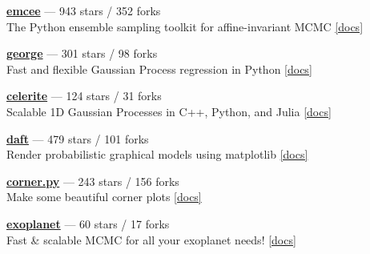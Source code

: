 \item \href{https://github.com/dfm/emcee}{{\bf emcee}} --- 943 stars / 352 forks \\
The Python ensemble sampling toolkit for affine-invariant MCMC \href{http://emcee.readthedocs.io}{[docs]}

\item \href{https://github.com/dfm/george}{{\bf george}} --- 301 stars / 98 forks \\
Fast and flexible Gaussian Process regression in Python \href{http://george.readthedocs.io}{[docs]}

\item \href{https://github.com/dfm/celerite}{{\bf celerite}} --- 124 stars / 31 forks \\
Scalable 1D Gaussian Processes in C++, Python, and Julia \href{http://celerite.rtfd.io}{[docs]}

\item \href{https://github.com/daft-dev/daft}{{\bf daft}} --- 479 stars / 101 forks \\
Render probabilistic graphical models using matplotlib \href{http://daft-pgm.org}{[docs]}

\item \href{https://github.com/dfm/corner.py}{{\bf corner.py}} --- 243 stars / 156 forks \\
Make some beautiful corner plots \href{http://corner.readthedocs.io}{[docs]}

\item \href{https://github.com/dfm/exoplanet}{{\bf exoplanet}} --- 60 stars / 17 forks \\
Fast {\&} scalable MCMC for all your exoplanet needs!  \href{https://exoplanet.dfm.io}{[docs]}
